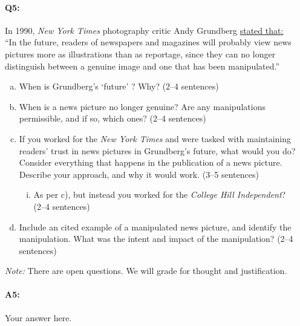 


\pagebreak
\paragraph{Q5:} 
In 1990, \emph{New York Times} photography critic Andy Grundberg \href{https://www.nytimes.com/1990/08/12/arts/photography-view-ask-it-no-questions-the-camera-can-lie.html}{stated that:}\\``In the future, readers of newspapers and
magazines will probably view news pictures more as
illustrations than as reportage, since they can no longer distinguish between a genuine image and one that has been manipulated.''

\begin{enumerate}[(a)]
    \item When is Grundberg's `future' ? Why? (2--4 sentences)
    
    \item When is a news picture no longer genuine? Are any manipulations permissible, and if so, which ones? (2--4 sentences)
    
    \item If you worked for the \emph{New York Times} and were tasked with maintaining readers' trust in news pictures in Grundberg's future, what would you do? Consider everything that happens in the publication of a news picture. Describe your approach, and why it would work. (3--5 sentences)
    
    \begin{enumerate}[(i)]
    \item As per c), but instead you worked for the \emph{College Hill Independent}? \\(2--4 sentences)
    \end{enumerate}
    
    \item Include an cited example of a manipulated news picture, and identify the manipulation. What was the intent and impact of the manipulation? (2--4 sentences)
\end{enumerate}

\emph{Note:} There are open questions. We will grade for thought and justification. 

\paragraph{A5:} Your answer here.

